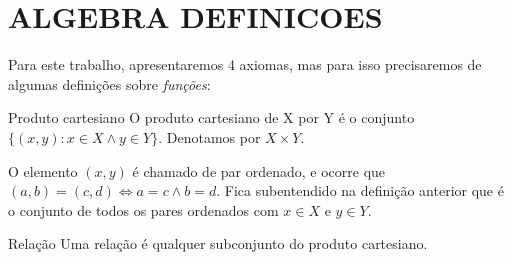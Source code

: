 \documentclass[../main.tex]{subfiles}
\begin{document}
\chapter{ALGEBRA DEFINICOES}

Para este trabalho, apresentaremos 4 axiomas, mas para isso precisaremos de algumas definições sobre \emph{funções}:

\begin{defi}{Produto cartesiano}
    O produto cartesiano de X por Y é o conjunto $\{(x,y) : x \in X \land y \in Y\}$. Denotamos por $X \times Y$.
\end{defi}
\begin{obs}
    O elemento $(x,y)$ é chamado de par ordenado, e ocorre que $(a,b) = (c,d) \iff a = c \land b = d$. Fica subentendido na definição anterior que é o conjunto de todos os pares ordenados com $x \in X$ e $y \in Y$.
\end{obs}

\begin{defi}{Relação}
    Uma relação é qualquer subconjunto do produto cartesiano.
\end{defi}
\end{document}
